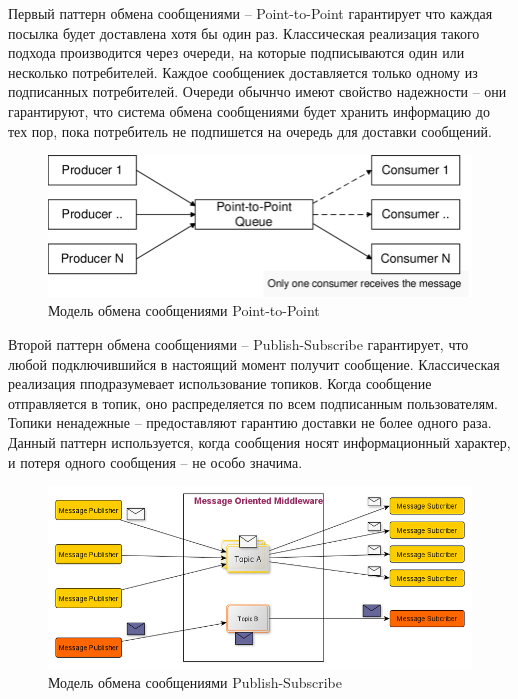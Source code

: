 Первый паттерн обмена сообщениями -- Point-to-Point гарантирует что каждая
посылка будет доставлена хотя бы один раз. Классическая реализация такого
подхода производится через очереди, на которые подписываются один или несколько
потребителей. Каждое сообщениек доставляется только одному из подписанных
потребителей. Очереди обычнчо имеют свойство надежности -- они гарантируют, что
система обмена сообщениями будет хранить информацию до тех пор, пока потребитель
не подпишется на очередь для доставки сообщений.
\begin{figure}[H]
    \centering
    \includegraphics[scale=0.45]{inc/img/PTP-messaging-model.png}
    \caption{Модель обмена сообщениями Point-to-Point}
\end{figure}

Второй паттерн обмена сообщениями -- Publish-Subscribe гарантирует, что любой
подключившийся в настоящий момент получит сообщение. Классическая реализация
пподразумевает использование топиков. Когда сообщение отправляется в топик, оно
распределяется по всем подписанным пользователям. Топики ненадежные --
предоставляют гарантию доставки не более одного раза. Данный паттерн
используется, когда сообщения носят информационный характер, и потеря одного
сообщения -- не особо значима.
\begin{figure}[H]
    \centering
    \includegraphics[scale=0.45]{inc/img/Publish-Subscribe-messaging-model.png}
    \caption{Модель обмена сообщениями Publish-Subscribe}
\end{figure}


